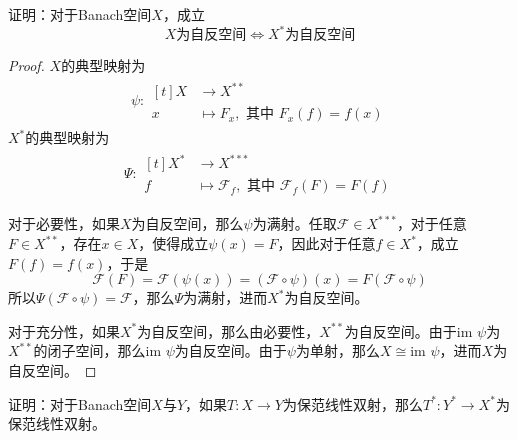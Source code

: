 \documentclass[lang = cn, scheme = chinese, 10pt]{elegantbook}
\newcommand{\im}{\text{im }}   %
\begin{document}
\begin{proposition}
	证明：对于Banach空间$X$，成立
	$$
	X\text{为自反空间}\iff X^*\text{为自反空间}
	$$
\end{proposition}

\begin{proof}
	$X$的典型映射为
	\begin{align*}
		\psi:\begin{aligned}[t]
			X&\longrightarrow X^{**}\\
			x&\longmapsto F_x,\text{ 其中 }F_x(f)=f(x)
		\end{aligned}
	\end{align*}
	$X^{*}$的典型映射为
	\begin{align*}
		\Psi:\begin{aligned}[t]
			X^{*}&\longrightarrow X^{***}\\
			f&\longmapsto \mathscr{F}_f,\text{ 其中 }\mathscr{F}_f(F)=F(f)
		\end{aligned}
	\end{align*}
	
	对于必要性，如果$X$为自反空间，那么$\psi$为满射。任取$\mathscr{F}\in X^{***}$，对于任意$F\in X^{**}$，存在$x\in X$，使得成立$\psi(x)=F$，因此对于任意$f\in X^*$，成立$F(f)=f(x)$，于是
	$$
	\mathscr{F}(F)
	=\mathscr{F}(\psi(x))
	=(\mathscr{F}\circ\psi)(x)
	=F(\mathscr{F}\circ\psi)
	$$
	所以$\Psi(\mathscr{F}\circ\psi)=\mathscr{F}$，那么$\Psi$为满射，进而$X^*$为自反空间。
	
	对于充分性，如果$X^*$为自反空间，那么由必要性，$X^{**}$为自反空间。由于$\im \psi$为$X^{**}$的闭子空间，那么$\im\psi$为自反空间。由于$\psi$为单射，那么$X\cong\im\psi$，进而$X$为自反空间。
\end{proof}

\begin{proposition}
	证明：对于Banach空间$X$与$Y$，如果$T:X\to Y$为保范线性双射，那么$T^*:Y^*\to X^*$为保范线性双射。
\end{proposition}
\end{document}
